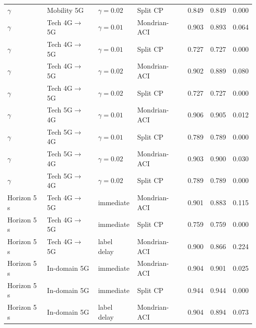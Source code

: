 \begin{table}[!t]
\begin{tabular}{llllrrr}
$\gamma$ & Mobility 5G & $\gamma=0.02$ & Split CP & 0.849 & 0.849 & 0.000 \\
$\gamma$ & Tech 4G$\rightarrow$5G & $\gamma=0.01$ & Mondrian-ACI & 0.903 & 0.893 & 0.064 \\
$\gamma$ & Tech 4G$\rightarrow$5G & $\gamma=0.01$ & Split CP & 0.727 & 0.727 & 0.000 \\
$\gamma$ & Tech 4G$\rightarrow$5G & $\gamma=0.02$ & Mondrian-ACI & 0.902 & 0.889 & 0.080 \\
$\gamma$ & Tech 4G$\rightarrow$5G & $\gamma=0.02$ & Split CP & 0.727 & 0.727 & 0.000 \\
$\gamma$ & Tech 5G$\rightarrow$4G & $\gamma=0.01$ & Mondrian-ACI & 0.906 & 0.905 & 0.012 \\
$\gamma$ & Tech 5G$\rightarrow$4G & $\gamma=0.01$ & Split CP & 0.789 & 0.789 & 0.000 \\
$\gamma$ & Tech 5G$\rightarrow$4G & $\gamma=0.02$ & Mondrian-ACI & 0.903 & 0.900 & 0.030 \\
$\gamma$ & Tech 5G$\rightarrow$4G & $\gamma=0.02$ & Split CP & 0.789 & 0.789 & 0.000 \\
Horizon 5\,s & Tech 4G$\rightarrow$5G & immediate & Mondrian-ACI & 0.901 & 0.883 & 0.115 \\
Horizon 5\,s & Tech 4G$\rightarrow$5G & immediate & Split CP & 0.759 & 0.759 & 0.000 \\
Horizon 5\,s & Tech 4G$\rightarrow$5G & label delay & Mondrian-ACI & 0.900 & 0.866 & 0.224 \\
Horizon 5\,s & In-domain 5G & immediate & Mondrian-ACI & 0.904 & 0.901 & 0.025 \\
Horizon 5\,s & In-domain 5G & immediate & Split CP & 0.944 & 0.944 & 0.000 \\
Horizon 5\,s & In-domain 5G & label delay & Mondrian-ACI & 0.904 & 0.894 & 0.073 \\
\bottomrule
\end{tabular}
\end{table}

